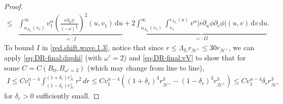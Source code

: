 \documentclass[10pt, reqno]{amsart}
\theoremstyle{definition}
\theoremstyle{remark}
\theoremstyle{conjecture}
\numberwithin{equation}{section}
\newcommand{\ud}{\mathrm{d}}
\newcommand{\rd}{\partial}
\newcommand{\0}{\emptyset}
\newcommand{\alp}{\alpha}
\newcommand{\omg}{\omega}
\newcommand{\calH}{\mathcal H}
\newcommand{\f}{\frac}
\newcommand{\de}{\delta}
\newcommand{\EH}{\calH^{+}}
\begin{document}
\begin{proof}
\begin{equation}
\begin{split}
\leq &  \underbrace{\int_{u_{\Lambda_{\de_r}}(v_1)}^\infty v_1^{\alp}\left(\f{r\rd_u\phi}{(-\nu)^{\f 12}}\right)^2(u,v_1)\, \ud u}_{=:I}+ 2\underbrace{\int_{u_{\Lambda_{\de_r}}(v_1)}^\infty\int_{v_1}^{v_{\Lambda_{\de_r}}(u)} v^{\alp} \left|r\rd_u\phi\rd_v\phi\right|(u,v)\,\ud v\, \ud u}_{=:II}.
\end{split}
\end{equation}
To bound $I$ in \eqref{red.shift.wave.1.3}, notice that since $r\leq \Lambda_{{\de_r}} r_{\EH}\leq 30 r_{\EH}$, we can apply \eqref{eq:DR-final:duphi} (with $\omg'=2$) and \eqref{eq:DR-final:vV} to show that for some $C=C(B_0, B_{\omg'=2})$ (which may change from line to line), 
\begin{equation}\label{red.shift.wave.1.4}
\begin{split}
I\leq C v_1^{\alp-4} \int_{(1-{\de_r})r_\EH}^{(1+{\de_r})r_\EH} r^2\, dr\leq  C v_1^{\alp-4}\left( (1+\de_r)^3 r_{\EH}^3-(1-{\de_r})^3 r_{\EH}^3\right) \leq C v_1^{\alp-4}{\de_r} r_{\EH}^3
\end{split}
\end{equation}
for ${\de_r}>0$ sufficiently small.


\end{proof}
\end{document}
